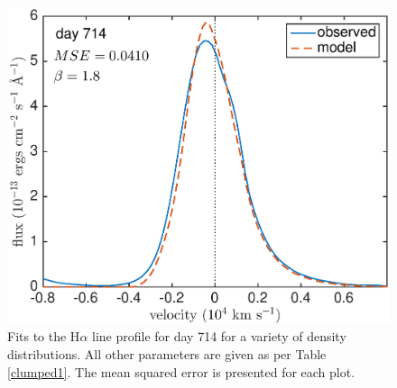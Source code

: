 \begin{figure}
\includegraphics[clip = true, scale=0.43, trim=20 0 40 0]{chapters/chapter5/images/MSE/d714_B/d714_B1_8}

\caption{Fits to the H$\alpha$ line profile for day 714 for a variety of density distributions.  All other parameters are given as per Table \ref{clumped1}. The mean squared error is presented for each plot.}
\end{figure}

